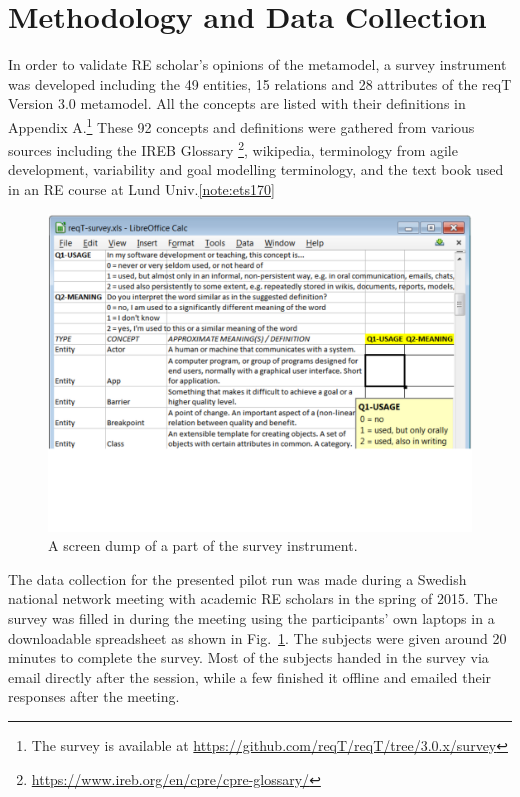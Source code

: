 \documentclass[runningheads,a4paper]{llncs}
\begin{document}
\section{Methodology and Data Collection}
In order to validate RE scholar's opinions of the metamodel, a survey instrument was developed including the 49 entities, 15 relations and 28 attributes of the reqT Version 3.0 metamodel. All the concepts are listed with their definitions in Appendix A.\footnote{The survey is available at \scriptsize\url{https://github.com/reqT/reqT/tree/3.0.x/survey}} These 92 concepts and definitions were gathered from various sources including the IREB Glossary \footnote{\scriptsize\url{https://www.ireb.org/en/cpre/cpre-glossary/}}, wikipedia, terminology from agile development, variability \cite{metzger2007variability} and goal modelling terminology, and the text book\cite{Lauesen2002} used in an RE course at Lund Univ.\cref{note:ets170} 
\vspace{-0.2cm}
\begin{figure}[h]
\centering
\includegraphics[width=\textwidth]{img/survey-screen-dump}
\caption{A screen dump of a part of the survey instrument.}
\label{fig:survey}
\end{figure}

\noindent The data collection for the presented pilot run was made during a Swedish national network meeting with academic RE scholars in the spring of 2015. The survey was filled in during the meeting using the participants' own laptops  in a downloadable spreadsheet as shown in Fig.~\ref{fig:survey}. The subjects were given around 20 minutes to complete the survey. Most of the subjects handed in the survey via email directly after the session, while a few finished it offline and emailed their responses after the meeting. 
\end{document}
